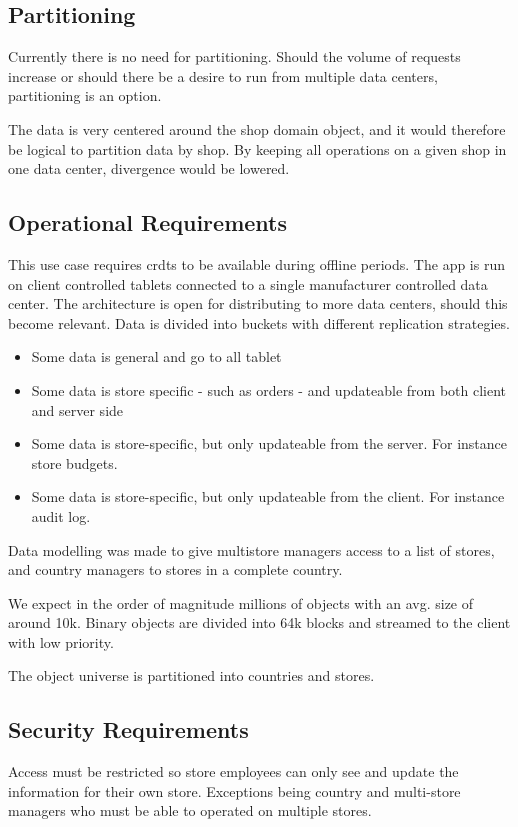 \documentclass[11pt,a4paper]{report}
\begin{document}
\subsection{Partitioning}
Currently there is no need for partitioning. Should the volume of requests increase or should there be a desire to run from multiple data centers, partitioning is an option.

The data is very centered around the shop domain object, and it would therefore be logical to partition data by shop. By keeping all operations on a given shop in one data center, divergence would be lowered.

\subsection{Operational Requirements}
This use case requires \glspl{crdt} to be available during offline periods.
The app is run on client controlled tablets connected to a single manufacturer controlled data center. The architecture is open for distributing to more data centers, should this become relevant.
Data is divided into buckets with different replication strategies. 
\begin{itemize}
\item Some data is general and go to all tablet
\item Some data is store specific - such as orders - and updateable from both client and server side
\item Some data is store-specific, but only updateable from the server. For instance store budgets.
\item Some data is store-specific, but only updateable from the client. For instance audit log.
\end{itemize}

Data modelling was made to give multistore managers access to a list of stores, and country managers to stores in a complete country.

We expect in the order of magnitude millions of objects with an avg. size of around 10k. Binary objects are divided into 64k blocks and streamed to the client with low priority.

The object universe is partitioned  into countries and stores.

\subsection{Security Requirements}
Access must be restricted so store employees can only see and update the information for their own store. Exceptions being country and multi-store managers who must be able to operated on multiple stores.
\end{document}
